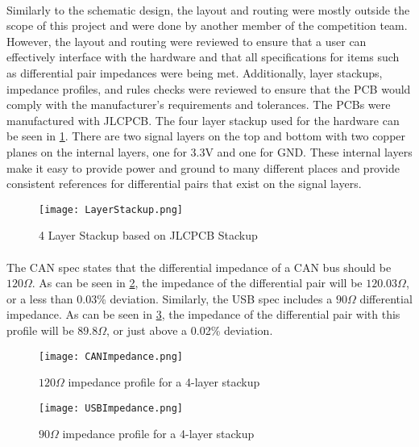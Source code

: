 \paragraph{}
Similarly to the schematic design, the layout and routing were mostly outside the scope of this project and were done by another member of the competition team.
However, the layout and routing were reviewed to ensure that a user can effectively interface with the hardware and that all specifications for items such as differential pair impedances were being met.
Additionally, layer stackups, impedance profiles, and rules checks were reviewed to ensure that the PCB would comply with the manufacturer's requirements and tolerances.
The PCBs were manufactured with JLCPCB.
The four layer stackup used for the hardware can be seen in \cref{fig:Stackup}.
There are two signal layers on the top and bottom with two copper planes on the internal layers, one for 3.3V and one for GND.
These internal layers make it easy to provide power and ground to many different places and provide consistent references for differential pairs that exist on the signal layers.

\begin{figure}[H]
	\centering
	\texttt{[image: LayerStackup.png]}
	\caption{4 Layer Stackup based on JLCPCB Stackup}
	\label{fig:Stackup}
\end{figure}

\paragraph{}
The CAN spec states that the differential impedance of a CAN bus should be $120 \Omega$.
As can be seen in \cref{fig:CANImpedance}, the impedance of the differential pair will be $120.03 \Omega$, or a less than 0.03\% deviation.
Similarly, the USB spec includes a $90 \Omega$ differential impedance.
As can be seen in \cref{fig:USBImpedance}, the impedance of the differential pair with this profile will be $89.8 \Omega$, or just above a 0.02\% deviation.

\begin{figure}[H]
	\centering
	\texttt{[image: CANImpedance.png]}
	\caption{$120 \Omega$ impedance profile for a 4-layer stackup}
	\label{fig:CANImpedance}
\end{figure}

\begin{figure}[H]
	\centering
	\texttt{[image: USBImpedance.png]}
	\caption{$90 \Omega$ impedance profile for a 4-layer stackup}
	\label{fig:USBImpedance}
\end{figure}

